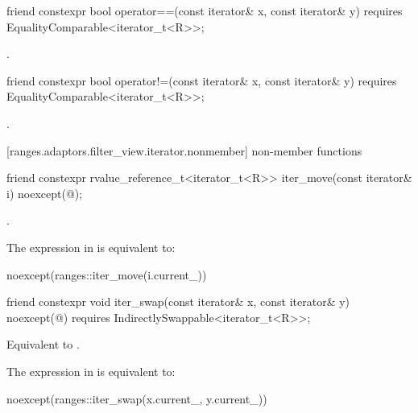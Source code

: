 %
\begin{itemdecl}
friend constexpr bool operator==(const iterator& x, const iterator& y)
  requires EqualityComparable<iterator_t<R>>;
\end{itemdecl}

\begin{itemdescr}
\pnum
\returns {}.
\end{itemdescr}

%
\begin{itemdecl}
friend constexpr bool operator!=(const iterator& x, const iterator& y)
  requires EqualityComparable<iterator_t<R>>;
\end{itemdecl}

\begin{itemdescr}
\pnum
\returns {}.
\end{itemdescr}

[ranges.adaptors.filter_view.iterator.nonmember]{ non-member functions}

%
\begin{itemdecl}
friend constexpr rvalue_reference_t<iterator_t<R>> iter_move(const iterator& i)
noexcept(@\seebelow@);
\end{itemdecl}

\begin{itemdescr}
\pnum
\returns {}.

\pnum
\remarks The expression in  is equivalent to:
\begin{codeblock}
noexcept(ranges::iter_move(i.current_))
\end{codeblock}
\end{itemdescr}

%
\begin{itemdecl}
friend constexpr void iter_swap(const iterator& x, const iterator& y)
noexcept(@\seebelow@) requires IndirectlySwappable<iterator_t<R>>;
\end{itemdecl}

\begin{itemdescr}
\pnum
\effects Equivalent to .

\pnum
\remarks The expression in  is equivalent to:
\begin{codeblock}
noexcept(ranges::iter_swap(x.current_, y.current_))
\end{codeblock}
\end{itemdescr}

